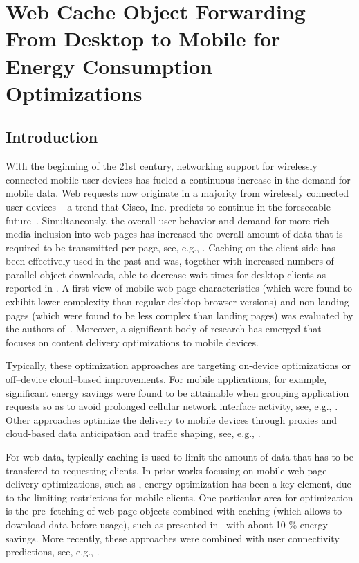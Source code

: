 \chapter{Web Cache Object Forwarding From Desktop to Mobile for Energy Consumption Optimizations}

\section*{Introduction}

With the beginning of the 21st century, networking support for wirelessly connected mobile user devices has fueled a continuous increase in the demand for mobile data.
Web requests now originate in a majority from wirelessly connected user devices -- a trend that Cisco, Inc. predicts to continue in the foreseeable future~\cite{VNI14}.
Simultaneously, the overall user behavior and demand for more rich media inclusion into web pages has increased the overall amount of data that is required to be transmitted per page, see, e.g., \cite{IhPa11,BuMaSe13}.
Caching on the client side has been effectively used in the past and was, together with increased numbers of parallel object downloads, able to decrease wait times for desktop clients as reported in \cite{IhPa11}.
A first view of mobile web page characteristics (which were found to exhibit lower complexity than regular desktop browser versions) and non-landing pages (which were found to be less complex than landing pages) was evaluated by the authors of~\cite{BuMaSe13}.
Moreover, a significant body of research has emerged that focuses on content delivery optimizations to mobile devices.

Typically, these optimization approaches are targeting on-device optimizations or off--device cloud--based improvements.
For mobile applications, for example, significant energy savings were found to be attainable when grouping application requests so as to avoid prolonged cellular network interface activity, see, e.g., \cite{BaBaVe09,QiWaGaHuGe12}.
Other approaches optimize the delivery to mobile devices through proxies and cloud-based data anticipation and traffic shaping, see, e.g., \cite{XiHuSaYl11}.

For web data, typically caching is used to limit the amount of data that has to be transfered to requesting clients.
In prior works focusing on mobile web page delivery optimizations, such as \cite{SaIs02}, energy optimization has been a key element, due to the limiting restrictions for mobile clients.
One particular area for optimization is the pre--fetching of web page objects combined with caching (which allows to download data before usage), such as presented in~\cite{ShKuDaWa05} with about 10 \% energy savings.
More recently, these approaches were combined with user connectivity predictions, see, e.g., \cite{ThChWo13}.

